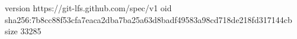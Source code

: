 version https://git-lfs.github.com/spec/v1
oid sha256:7b8cc88f53cfa7eaca2dba7ba25a63d8badf49583a98cd718de218fd317144cb
size 33285

